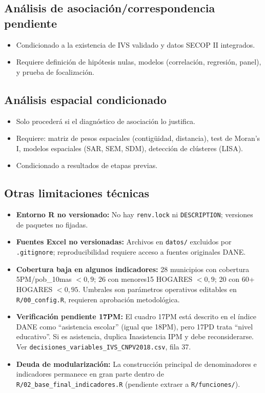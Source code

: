 \subsection{Análisis de asociación/correspondencia pendiente}
\label{sec:asociacion_pendiente}

\begin{itemize}
    \item Condicionado a la existencia de IVS validado y datos SECOP II integrados.
    \item Requiere definición de hipótesis nulas, modelos (correlación, regresión, panel), y prueba de focalización.
\end{itemize}

\subsection{Análisis espacial condicionado}
\label{sec:espacial_condicionado}

\begin{itemize}
    \item Solo procederá si el diagnóstico de asociación lo justifica.
    \item Requiere: matriz de pesos espaciales (contigüidad, distancia), test de Moran's I, modelos espaciales (SAR, SEM, SDM), detección de clústeres (LISA).
    \item Condicionado a resultados de etapas previas.
\end{itemize}

\subsection{Otras limitaciones técnicas}
\label{sec:otras_limitaciones}

\begin{itemize}
    \item \textbf{Entorno R no versionado:} No hay \texttt{renv.lock} ni \texttt{DESCRIPTION}; versiones de paquetes no fijadas.
    \item \textbf{Fuentes Excel no versionadas:} Archivos en \texttt{datos/} excluidos por \texttt{.gitignore}; reproducibilidad requiere acceso a fuentes originales DANE.
    \item \textbf{Cobertura baja en algunos indicadores:} 28 municipios con cobertura 5PM/pob\_10mas $<0,9$; 26 con menores15 HOGARES $<0,9$; 20 con 60+ HOGARES $<0,95$. Umbrales son parámetros operativos editables en \texttt{R/00\_config.R}, requieren aprobación metodológica.
    \item \textbf{Verificación pendiente 17PM:} El cuadro 17PM está descrito en el índice DANE como ``asistencia escolar'' (igual que 18PM), pero 17PD trata ``nivel educativo''. Si es asistencia, duplica Inasistencia IPM y debe reconsiderarse. Ver \texttt{decisiones\_variables\_IVS\_CNPV2018.csv}, fila 37.
    \item \textbf{Deuda de modularización:} La construcción principal de denominadores e indicadores permanece en gran parte dentro de \texttt{R/02\_base\_final\_indicadores.R} (pendiente extraer a \texttt{R/funciones/}).
\end{itemize}